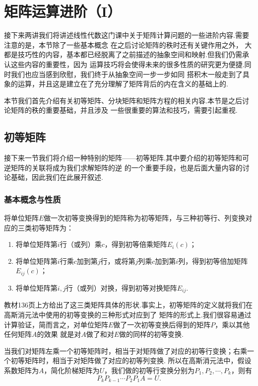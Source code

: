 \chapter{矩阵运算进阶（I）}

接下来两讲我们将讲述线性代数这门课中关于矩阵计算问题的一些进阶内容.需要注意的是，本节除了一些基本概念
在之后讨论矩阵的秩时还有关键作用之外，
大都是技巧性的内容，基本都已经脱离了之前描述的抽象空间和映射.但我们仍需承认这些内容的重要性，因为
运算技巧将会使得未来的很多性质的研究更为便捷.同时我们也应当感到欣慰，我们终于从抽象空间一步一步如同
搭积木一般走到了具象的运算，并且这是建立在了充分理解了矩阵背后的内在含义的基础上的.

本节我们首先介绍有关初等矩阵、分块矩阵和矩阵方程的相关内容.本节是之后讨论矩阵的秩的重要基础，并且涉及
一些很重要的算法和技巧，需要引起重视.

\section{初等矩阵}
接下来一节我们将介绍一种特别的矩阵——初等矩阵.其中要介绍的初等矩阵和可逆矩阵的关联将成为我们求解矩阵的逆
的一个重要手段，也是后面大量内容的讨论基础，因此我们在此展开叙述.

\subsection{基本概念与性质}
\begin{definition}
    将单位矩阵$E$做一次初等变换得到的矩阵称为初等矩阵，与三种初等行、列变换对应的三类初等矩阵为：
    \begin{enumerate}
        \item 将单位矩阵第$i$行（或列）乘$c$，得到初等倍乘矩阵$E_i(c)$；

        \item 将单位矩阵第$i$行乘$c$加到第$j$行，或将第$j$列乘$c$加到第$i$列，得到初等倍加矩阵$E_{ij}(c)$；

        \item 将单位矩阵第$i,j$行（或列）对换，得到初等对换矩阵$E_{ij}$.
    \end{enumerate}
\end{definition}
教材136页上方给出了这三类矩阵具体的形状.事实上，初等矩阵的定义就将我们在高斯消元法中使用的初等变换的三种形式对应到了
矩阵的形式上.我们很容易通过计算验证，简而言之，对单位矩阵$E$做了一次初等变换后得到的矩阵$P$，乘以其他任何矩阵$A$的效果
就是对$A$做了和对$E$做的同样的初等变换.

当我们对矩阵左乘一个初等矩阵时，相当于对矩阵做了对应的初等行变换；右乘一个初等矩阵时，相当于对矩阵做了对应的初等列变换.
所以在高斯消元法中，假设系数矩阵为$A$，简化阶梯矩阵为$U$，我们做的初等行变换分别为$P_1,P_2,\cdots,P_k$，则有
\[P_kP_{k-1}\cdots P_2P_1A=U.\]

